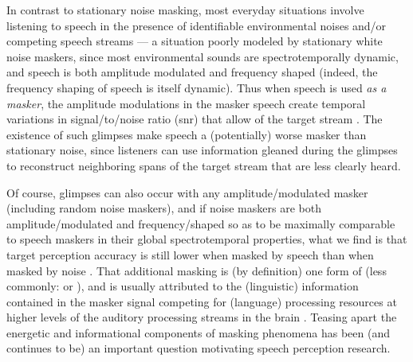 \label{par:Glimpsing}In contrast to stationary noise masking, most everyday situations involve listening to speech in the presence of identifiable environmental noises and/or competing speech streams — a situation poorly modeled by stationary white noise maskers, since most environmental sounds are spectrotemporally dynamic, and speech is both amplitude modulated and frequency shaped (indeed, the frequency shaping of speech is itself dynamic).  Thus when speech is used \emph{as a masker}, the amplitude modulations in the masker speech create temporal variations in signal\-/to\-/noise ratio (\ac{snr}) that allow  of the target stream \citep[\intal]{MillerLicklider1950, FestenPlomp1990}.  The existence of such glimpses make speech a (potentially) worse masker than stationary noise, since listeners can use information gleaned during the glimpses to reconstruct neighboring spans of the target stream that are less clearly heard.\footnotemark{}

Of course, glimpses can also occur with any amplitude\-/modulated masker (including random noise maskers), and if noise maskers are both amplitude\-/modulated and frequency\-/shaped so as to be maximally comparable to speech maskers in their global spectrotemporal properties, what we find is that target perception accuracy is still lower when masked by speech than when masked by noise \citep[\intal]{CarhartEtAl1969,LewisEtAl1988,SimpsonCooke2005}.  That additional masking is (by definition) one form of  (less commonly:  or ), and is usually attributed to the (linguistic) information contained in the masker signal competing for (language) processing resources at higher levels of the auditory processing streams in the brain \citep{DurlachEtAl2003a}.  Teasing apart the energetic and informational components of masking phenomena has been (and continues to be) an important question motivating speech perception research.

